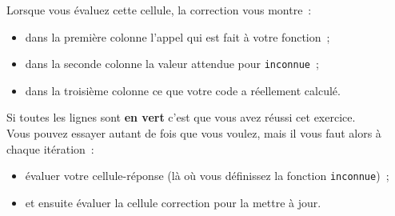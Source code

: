     Lorsque vous évaluez cette cellule, la correction vous montre~:

\begin{itemize}
\tightlist
\item
  dans la première colonne l'appel qui est fait à votre fonction~;
\item
  dans la seconde colonne la valeur attendue pour \texttt{inconnue}~;
\item
  dans la troisième colonne ce que votre code a réellement calculé.
\end{itemize}

Si toutes les lignes sont \textbf{en vert} c'est que vous avez réussi
cet exercice.\\

    Vous pouvez essayer autant de fois que vous voulez, mais il vous faut
alors à chaque itération~:

\begin{itemize}
\tightlist
\item
  évaluer votre cellule-réponse (là où vous définissez la fonction
  \texttt{inconnue})~;
\item
  et ensuite évaluer la cellule correction pour la mettre à jour.
\end{itemize}